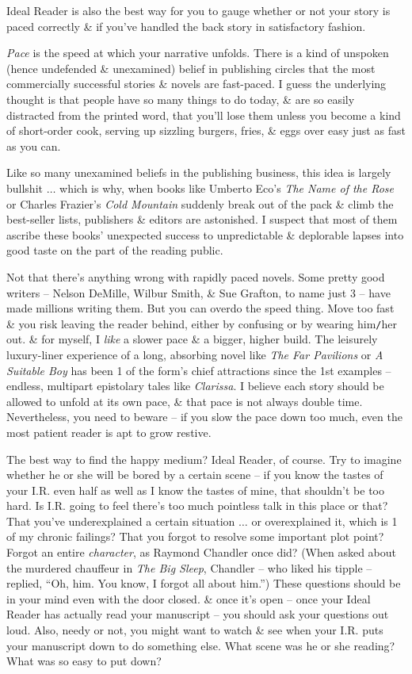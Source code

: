 \documentclass{article}
\numberwithin{equation}{section}
\begin{document}
 Ideal Reader is also the best way for you to gauge whether or not your story is paced correctly \& if you've handled the back story in satisfactory fashion.

\textit{Pace} is the speed at which your narrative unfolds. There is a kind of unspoken (hence undefended \& unexamined) belief in publishing circles that the most commercially successful stories \& novels are fast-paced. I guess the underlying thought is that people have so many things to do today, \& are so easily distracted from the printed word, that you'll lose them unless you become a kind of short-order cook, serving up sizzling burgers, fries, \& eggs over easy just as fast as you can.

Like so many unexamined beliefs in the publishing business, this idea is largely bullshit $\ldots$ which is why, when books like Umberto Eco's \textit{The Name of the Rose} or Charles Frazier's \textit{Cold Mountain} suddenly break out of the pack \& climb the best-seller lists, publishers \& editors are astonished. I suspect that most of them ascribe these books' unexpected success to unpredictable \& deplorable lapses into good taste on the part of the reading public.

Not that there's anything wrong with rapidly paced novels. Some pretty good writers -- Nelson DeMille, Wilbur Smith, \& Sue Grafton, to name just 3 -- have made millions writing them. But you can overdo the speed thing. Move too fast \& you risk leaving the reader behind, either by confusing or by wearing him{\tt/}her out. \& for myself, I \textit{like} a slower pace \& a bigger, higher build. The leisurely luxury-liner experience of a long, absorbing novel like \textit{The Far Pavilions} or \textit{A Suitable Boy} has been 1 of the form's chief attractions since the 1st examples -- endless, multipart epistolary tales like \textit{Clarissa}. I believe each story should be allowed to unfold at its own pace, \& that pace is not always double time. Nevertheless, you need to beware -- if you slow the pace down too much, even the most patient reader is apt to grow restive.

The best way to find the happy medium? Ideal Reader, of course. Try to imagine whether he or she will be bored by a certain scene -- if you know the tastes of your I.R. even half as well as I know the tastes of mine, that shouldn't be too hard. Is I.R. going to feel there's too much pointless talk in this place or that? That you've underexplained a certain situation $\ldots$ or overexplained it, which is 1 of my chronic failings? That you forgot to resolve some important plot point? Forgot an entire \textit{character}, as Raymond Chandler once did? (When asked about the murdered chauffeur in \textit{The Big Sleep}, Chandler -- who liked his tipple -- replied, ``Oh, him. You know, I forgot all about him.'') These questions should be in your mind even with the door closed. \& once it's open -- once your Ideal Reader has actually read your manuscript -- you should ask your questions out loud. Also, needy or not, you might want to watch \& see when your I.R. puts your manuscript down to do something else. What scene was he or she reading? What was so easy to put down?
\end{document}
